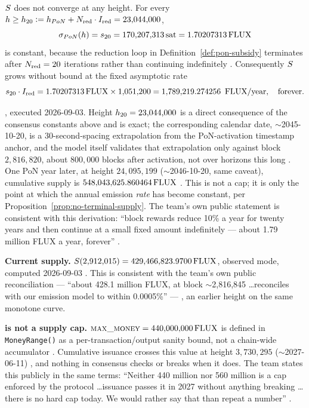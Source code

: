 \begin{proposition}
\label{prop:no-terminal-supply}
$S$ does not converge at any height. For every $h \ge h_{20} \vcentcolon= h_{PoN} + N_{\mathrm{red}}\cdot I_{\mathrm{red}} = 23{,}044{,}000$,
$$
\sigma_{PoN}(h) = s_{20} = 170{,}207{,}313\,\mathrm{sat} = 1.70207313\,\mathrm{FLUX}
$$
is constant, because the reduction loop in Definition~\ref{def:pon-subsidy} terminates after
$N_{\mathrm{red}} = 20$ iterations rather than continuing indefinitely
\shipped {}. Consequently $S$ grows without bound at the
fixed asymptotic rate
$$
s_{20} \cdot \redint = 1.70207313\flux \times 1{,}051{,}200 = 1{,}789{,}219.274256\ \flux/\mathrm{year}, \quad \text{forever}.
$$
\end{proposition}
\shipped {}, executed 2026-09-03.
Height $h_{20} = 23{,}044{,}000$ is a direct consequence of the consensus constants above and is
exact; the corresponding calendar date, $\sim$2045-10-20, is a 30-second-spacing extrapolation from
the PoN-activation timestamp anchor, and the model itself validates that extrapolation only against
block $2{,}816{,}820$, about $800{,}000$ blocks after activation, not over horizons this long
.
One PoN year later, at height $24{,}095{,}199$ ($\sim$2046-10-20, same caveat), cumulative supply is
$548{,}043{,}625.860464\,\mathrm{FLUX}$ \shipped {}.
This is not a cap; it is only the point at which the annual emission \emph{rate} has become
constant, per Proposition~\ref{prop:no-terminal-supply}. The team's own public statement is
consistent with this derivation: ``block rewards reduce 10\% a year for twenty years and then
continue at a small fixed amount indefinitely — about 1.79 million FLUX a year, forever''
.

\textbf{Current supply.} $S(2{,}912{,}015) = 429{,}466{,}823.9700\,\mathrm{FLUX}$, observed mode,
computed 2026-09-03 \shipped {}. This is
consistent with the team's own public reconciliation — ``about 428.1 million FLUX, at block
$\sim$2,816,845 \dots reconciles with our emission model to within 0.0005\%'' —
, an earlier height on the same monotone curve.

\textbf{\maxmoney is not a supply cap.} $\textsc{max\_money} = 440{,}000{,}000\,\mathrm{FLUX}$ is defined in
\texttt{MoneyRange()} as a per-transaction/output sanity bound, not a chain-wide accumulator
\shipped {}. Cumulative issuance crosses this value at height
$3{,}730{,}295$ ($\sim$2027-06-11) \shipped {},
and nothing in consensus checks or breaks when it does. The team states this publicly in the same
terms: ``Neither 440 million nor 560 million is a cap enforced by the protocol \dots issuance
passes it in 2027 without anything breaking \dots there is no hard cap today. We would rather say
that than repeat a number'' .

